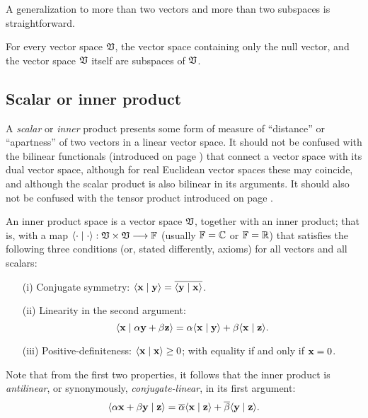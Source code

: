 A generalization to more than two vectors and more than two subspaces is straightforward.


For every vector space ${\frak V}$, the vector space containing only the null vector,
 and the vector space ${\frak V}$ itself are subspaces of ${\frak V}$.

\subsection{Scalar or inner product}
\label{2011-m-scalarproduct}

A {\em scalar} or {\em inner} product presents some form of measure of ``distance'' or ``apartness''
of two vectors in a linear vector space.
It should not be confused with the bilinear functionals (introduced on page \pageref{2011-m-dvs}) that connect a vector space with its dual vector space,
although for real Euclidean vector spaces these may coincide,
and although the scalar product is also bilinear in its arguments.
It should also not be confused with the tensor product introduced on page \pageref{2011-m-tensorp}.

An inner product space is a vector space $\frak V$,
together with an inner product; that is, with a map
 $\langle \cdot \mid \cdot \rangle :  \frak V  \times  \frak V  \longrightarrow {\Bbb F}$
 (usually ${\Bbb F}={\Bbb C}$ or ${\Bbb F}={\Bbb R}$)
 that satisfies the following three conditions (or, stated differently, axioms) for all vectors  and all scalars:
\begin{itemize}
\item[(i)]
Conjugate symmetry:
$
\langle {\bf x}\mid {\bf y}\rangle
=
\overline{\langle {\bf y}\mid {\bf x}\rangle }$.
\item[(ii)]
Linearity in the second argument:
$$
\langle {\bf x} \mid \alpha {\bf y} +\beta {\bf z}\rangle
=
\alpha {\langle {\bf x}\mid {\bf y}\rangle}
+
\beta {\langle {\bf x}\mid {\bf z}\rangle}
.
$$

\item[(iii)]
Positive-definiteness:
$
\langle {\bf x}\mid {\bf x}\rangle
\ge
0$;  with equality if and only if ${\bf x} = 0$.
\end{itemize}

 Note that from the first two properties, it follows that the inner product is
{\em antilinear}, or synonymously,
{\em conjugate-linear}, in its first argument:
 $$
 \langle \alpha {\bf x} + \beta {\bf y} \mid {\bf z}\rangle
 =
 \overline{\alpha} {\langle {\bf x}\mid {\bf z}\rangle}
 +\overline{\beta} {\langle {\bf y}\mid {\bf z}\rangle}
.
 $$



